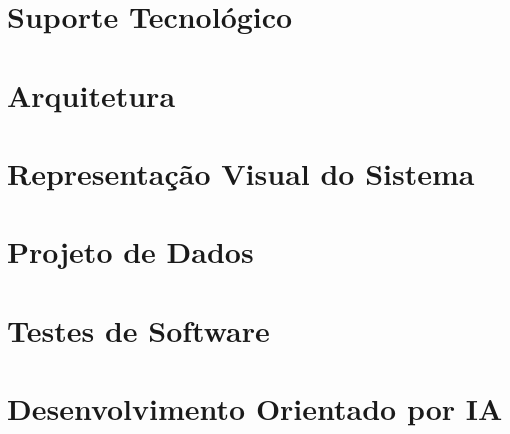 \section{Suporte Tecnológico}


\section{Arquitetura}


\section{Representação Visual do Sistema}


\section{Projeto de Dados}


\section{Testes de Software}
\label{sec:testes-software}


\section{Desenvolvimento Orientado por IA}
\label{sec:dev-ia}

